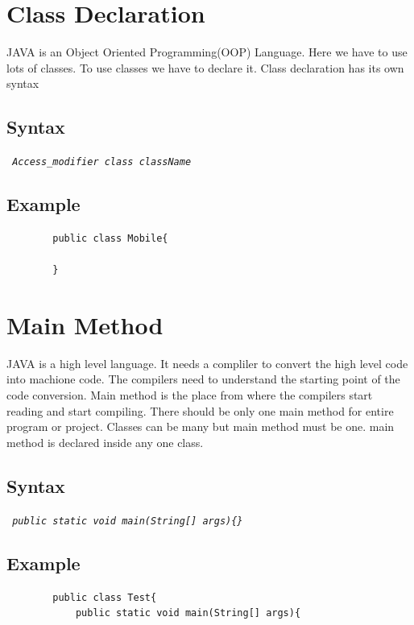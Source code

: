 \documentclass[openany]{book}  %
\begin{document}
\begin{flushleft}
    \section{Class Declaration}
    JAVA is an Object Oriented Programming(OOP) Language. Here we have to use lots of classes. To use classes we have to declare it. Class declaration has its own syntax
    \subsection{Syntax}
    \begin{center}
        \tt{
            \textit{Access\_modifier class className}
        }
    \end{center}
    \subsection{Example}
    \begin{center}
        \begin{verbatim}
        public class Mobile{

        }
    \end{verbatim}
    \end{center}

    \section{Main Method}
    JAVA is a high level language. It needs a compliler to convert the high level code into machione code. The compilers need to understand the starting point of the code conversion.
    Main method is the place from where the compilers start reading and start compiling. There should be only one main method for entire program or project. Classes can be many but main method
    must be one. main method is declared inside any one class.
    \subsection{Syntax}
    \begin{center}
        \tt{
            \textit{public static void main(String[] args)\{\}}
        }
    \end{center}
    \subsection{Example}
    \begin{center}
        \begin{verbatim}
        public class Test{
            public static void main(String[] args){


\end{verbatim}
\end{center}
\end{flushleft}
\end{document}
